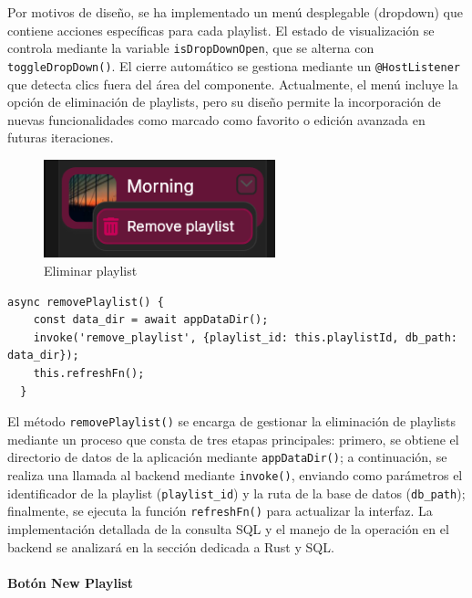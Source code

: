 \documentclass[11pt, a4paper]{article}
\begin{document}
                Por motivos de diseño, se ha implementado un menú desplegable (dropdown) que contiene acciones específicas para cada playlist. El estado de visualización se controla mediante la variable \texttt{isDropDownOpen}, que se alterna con \texttt{toggleDropDown()}. El cierre automático se gestiona mediante un \texttt{@HostListener} que detecta clics fuera del área del componente. Actualmente, el menú incluye la opción de eliminación de playlists, pero su diseño permite la incorporación de nuevas funcionalidades como marcado como favorito o edición avanzada en futuras iteraciones.

                \begin{figure}[H]
                    \centering
                    \includegraphics[width=0.6\textwidth]{media/screenshots/remove_playlist.png}
                    \caption{Eliminar playlist}
                    \label{fig:eliminar playlist}
                \end{figure}

                \begin{lstlisting}[caption={removePlaylist()}]
async removePlaylist() {
    const data_dir = await appDataDir();
    invoke('remove_playlist', {playlist_id: this.playlistId, db_path: data_dir});
    this.refreshFn();
  }
                \end{lstlisting}

                El método \texttt{removePlaylist()} se encarga de gestionar la eliminación de playlists mediante un proceso que consta de tres etapas principales: primero, se obtiene el directorio de datos de la aplicación mediante \texttt{appDataDir()}; a continuación, se realiza una llamada al backend mediante \texttt{invoke()}, enviando como parámetros el identificador de la playlist (\texttt{playlist\_id}) y la ruta de la base de datos (\texttt{db\_path}); finalmente, se ejecuta la función \texttt{refreshFn()} para actualizar la interfaz. La implementación detallada de la consulta SQL y el manejo de la operación en el backend se analizará en la sección dedicada a Rust y SQL.

                \paragraph{Botón New Playlist}
                ‎ \\
\end{document}
